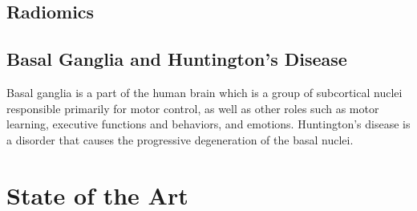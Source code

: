\subsection{Radiomics}



\subsection{Basal Ganglia and Huntington’s Disease}

Basal ganglia is a part of the human brain which is a group of subcortical nuclei responsible primarily for motor control, as well as other roles such as motor learning, executive functions and behaviors, and emotions. \cite{basal} Huntington’s disease is a disorder that causes the progressive degeneration of the basal nuclei. \cite{hunting}\par

\section{State of the Art}

